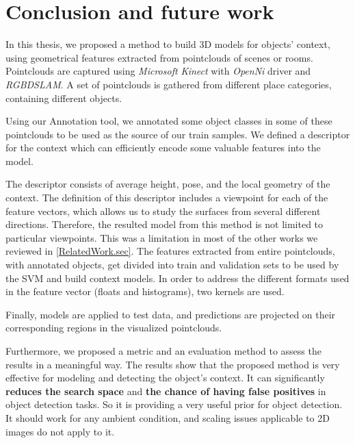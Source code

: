 \chapter{Conclusion and future work}
\label{Conclusion.ch}
In this thesis, we proposed a method to build 3D models for objects' context, using geometrical features extracted from pointclouds of scenes or rooms. Pointclouds are captured using {\it Microsoft Kinect} with {\it OpenNi} driver and {\it RGBDSLAM}.
A set of pointclouds is gathered from different place categories, containing different objects. 


Using our Annotation tool, we annotated some object classes in some of these pointclouds to be used as the source of our train samples. 
We defined a descriptor for the context which can efficiently encode some valuable features into the model. 

The descriptor consists of average height, pose, and the local geometry of the context. The definition of this descriptor includes a viewpoint for each of the feature vectors, which allows us to study the surfaces from several different directions. Therefore, the resulted model from this method is not limited to particular viewpoints. This was a limitation in most of the other works we reviewed in \ref{RelatedWork.sec}.
The features extracted from entire pointclouds, with annotated objects, get divided into train and validation sets to be used by the SVM and build context models. In order to address the different formats used in the feature vector (floats and histograms), two kernels are used.

Finally, models are applied to test data, and predictions are projected on their corresponding regions in the visualized pointclouds.

Furthermore, we proposed a metric and an evaluation method to assess the results in a meaningful way. The results show that the proposed method is very effective for modeling and detecting the object's context. It can significantly {\bf reduces the search space} and {\bf the chance of having false positives} in object detection tasks. So it is providing a very useful prior for object detection. It should work for any ambient condition, and scaling issues applicable to 2D images do not apply to it. 

